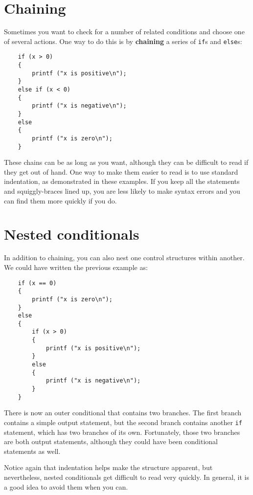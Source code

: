 \section {Chaining}

Sometimes you want to check for a number of related conditions
and choose one of several actions.  One way to do this is by
{\bf chaining} a series of {\tt if}s and {\tt else}s:

\begin{verbatim}
    if (x > 0) 
    {
        printf ("x is positive\n");
    } 
    else if (x < 0) 
    {
        printf ("x is negative\n");
    } 
    else 
    {
        printf ("x is zero\n");
    }
\end{verbatim}
%
These chains can be as long as you want, although they can
be difficult to read if they get out of hand.  One way to
make them easier to read is to use standard indentation,
as demonstrated in these examples.  If you keep all the
statements and squiggly-braces lined up, you are less
likely to make syntax errors and you can find them more
quickly if you do.

\section{Nested conditionals}

In addition to chaining, you can also nest one control structures
within another.  We could have written the previous example
as:

\begin{verbatim}
    if (x == 0) 
    {
        printf ("x is zero\n");
    } 
    else 
    {
        if (x > 0) 
        {
            printf ("x is positive\n");
        }
        else 
        {
            printf ("x is negative\n");
        }
    }
\end{verbatim}
%
There is now an outer conditional that contains two branches.  The
first branch contains a simple output statement, but the second
branch contains another {\tt if} statement, which has two branches
of its own.  Fortunately, those two branches are both output
statements, although they could have been conditional statements as
well.

Notice again that indentation helps make the structure
apparent, but nevertheless, nested conditionals get difficult to read
very quickly.  In general, it is a good idea to avoid them when you
can.


